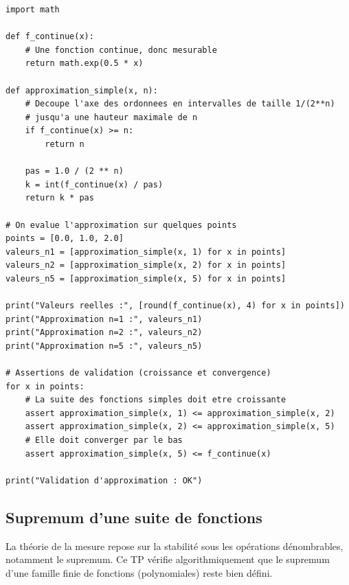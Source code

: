 \documentclass[11pt,a4paper]{article}
\begin{document}
\begin{lstlisting}
import math

def f_continue(x):
    # Une fonction continue, donc mesurable
    return math.exp(0.5 * x)

def approximation_simple(x, n):
    # Decoupe l'axe des ordonnees en intervalles de taille 1/(2**n)
    # jusqu'a une hauteur maximale de n
    if f_continue(x) >= n:
        return n

    pas = 1.0 / (2 ** n)
    k = int(f_continue(x) / pas)
    return k * pas

# On evalue l'approximation sur quelques points
points = [0.0, 1.0, 2.0]
valeurs_n1 = [approximation_simple(x, 1) for x in points]
valeurs_n2 = [approximation_simple(x, 2) for x in points]
valeurs_n5 = [approximation_simple(x, 5) for x in points]

print("Valeurs reelles :", [round(f_continue(x), 4) for x in points])
print("Approximation n=1 :", valeurs_n1)
print("Approximation n=2 :", valeurs_n2)
print("Approximation n=5 :", valeurs_n5)

# Assertions de validation (croissance et convergence)
for x in points:
    # La suite des fonctions simples doit etre croissante
    assert approximation_simple(x, 1) <= approximation_simple(x, 2)
    assert approximation_simple(x, 2) <= approximation_simple(x, 5)
    # Elle doit converger par le bas
    assert approximation_simple(x, 5) <= f_continue(x)

print("Validation d'approximation : OK")
\end{lstlisting}


\vspace{0.5cm}

\subsection*{Supremum d'une suite de fonctions}

La théorie de la mesure repose sur la stabilité sous les opérations dénombrables, notamment le supremum. Ce TP vérifie algorithmiquement que le supremum d'une famille finie de fonctions (polynomiales) reste bien défini.
\end{document}
